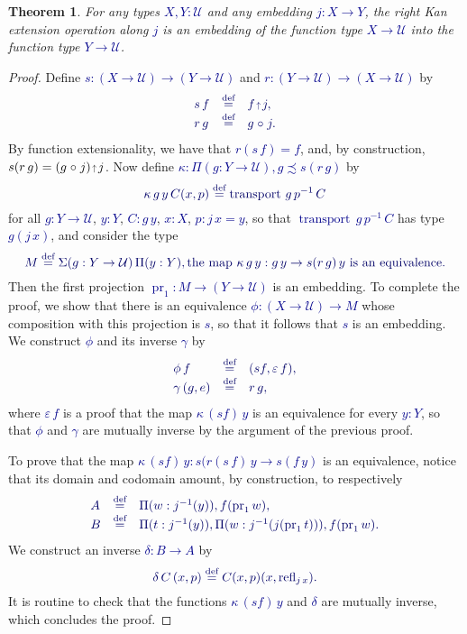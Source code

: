 \documentclass[10pt]{article}
\newcommand{\db}{\textcolor{darkblue}}
\newcommand{\m}[1]{\db{$#1$}}
\newcommand{\M}[1]{\[\db{#1}\]}
\newcommand{\transport}{\operatorname{transport}}
\newcommand{\fst}{\operatorname{pr}_1}
\newcommand{\comp}{\mathrel{\circ}}
\newcommand{\U}{\mathcal{U}}
\newcommand{\refl}{\operatorname{refl}}
\newcommand{\eqdef}{\overset{\text{def}}{=}}
\newcommand{\eup}{\scaleobj{0.7}{\,\uparrow\,}}
\newtheorem{theorem}[numbered]{Theorem}
\theoremstyle{definition}
\begin{document}
\begin{theorem}
For any types \m{X,Y:\U} and any embedding \m{j : X \to Y}, the right Kan extension operation along \m{j} is an embedding of the function type \m{X \to \U} into the function type \m{Y \to \U}.
\end{theorem}
\begin{proof}
  Define \m{s : (X \to \U) \to (Y \to \U)} and \m{r : (Y \to \U) \to (X \to \U)} by
  \M{
    \begin{array}{lll}
      s \, f & \eqdef & f \eup j, \\
      r \,  g & \eqdef & g \comp j.
    \end{array}
  }
  By function extensionality, we have that \m{r (s \, f) = f},
  and, by construction, \m{s (r \, g) = (g \comp j) \eup
    j}. Now define \m{\kappa : \Pi (g : Y \to \U), g \precsim s(r \,g)
    } by
  \M{
    \kappa \, g \, y \, C (x , p) \eqdef \transport \, g \, p^{-1} \, C
  }
  for all \m{g : Y \to \U}, \m{y : Y}, \m{C : g \, y}, \m{x : X}, \m{p : j \, x = y}, so that
  \m{\transport \, g \, p^{-1} \, C} has type \m{g (j \, x) },
  and consider the type
  \M{
    M \eqdef \Sigma (g : Y \to \U)\,\Pi(y:Y), \text{the map \m{\kappa \, g \, y : g \, y \to s (r \, g) \,y} is an equivalence.}
  }
  Then the first projection \m{\fst : M \to (Y \to \U)} is an embedding.  To complete the proof,
  we show that there is an equivalence \m{\phi : (X \to \U) \to M}
  whose composition with this projection is \m{s}, so that it follows that \m{s}
  is an embedding.  We
  construct \m{\phi} and its inverse \m{\gamma} by
  \M{
    \begin{array}{lll}
      \phi \, f & \eqdef & (s f , \varepsilon \, f), \\
      \gamma \, (g , e) & \eqdef & r \, g,
    \end{array}
  }
  where \m{\varepsilon \, f} is a proof that the map \m{\kappa \, (s
    f) \, y} is an equivalence for every \m{y : Y}, so that \m{\phi}
  and \m{\gamma} are mutually inverse by the argument of the previous
  proof.

  To prove that the map \m{\kappa \, (s f) \, y : s(r(s \,
    f) \, y \to s (f \, y)} is an equivalence, notice that its domain and
  codomain amount, by construction, to respectively
  \M{
    \begin{array}{lll}
      A & \eqdef & \Pi (w : j^{-1}(y)), f(\fst w), \\
      B & \eqdef & \Pi (t : j^{-1}(y)), \Pi (w : j^{-1}(j (\fst t))), f (\fst w).
    \end{array}
  }
  We construct an inverse \m{\delta : B \to A} by
  \M{
    \delta \, C \, (x , p) \eqdef C (x , p) (x , \refl_{j \, x}).
  }
  It is routine to check that the functions \m{\kappa \, (s f) \, y}
  and \m{\delta} are mutually inverse, which concludes the proof.
\end{proof}
\end{document}

